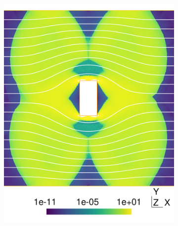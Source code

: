 \documentclass[11 pt]{report}
\begin{document}
\begin{figure}
\begin{subfigure}[t]{0.495\textwidth}
        \includegraphics[width=\textwidth]{../figures/cylinder_10.pdf}
        \label{fig:cylinder10}
    \end{subfigure}
    \begin{subfigure}[t]{0.495\textwidth}

\end{subfigure}
\end{figure}
\end{document}
